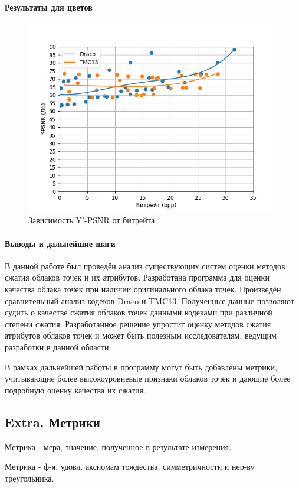 \documentclass[a4paper,12pt]{extreport}
\begin{document}
\paragraph{Результаты для цветов}

\begin{figure}[H]
    \centering
    \includegraphics[width=0.49\linewidth]{assets/approx_y_psnr.png}
    \caption{ Зависимость Y'-PSNR от битрейта. }
    \label{img:pcc_arena_y_psnr}
\end{figure}

\paragraph{Выводы и дальнейшие шаги}

В данной работе был проведён анализ существующих систем оценки методов сжатия
облаков точек и их атрибутов. Разработана программа для оценки качества облака
точек при наличии оригинального облака точек. Произведён сравнительный анализ
кодеков Draco и TMC13. Полученные данные позволяют судить о качестве сжатия
облаков точек данными кодеками при различной степени сжатия. Разработанное
решение упростит оценку методов сжатия атрибутов облаков точек и может быть
полезным исследователям, ведущим разработки в данной области.

В рамках дальнейшей работы в программу могут быть добавлены метрики, учитывающие
более высокоуровневые признаки облаков точек и дающие более подробную оценку
качества их сжатия.

\subsection*{Extra. Метрики}

\noindent Метрика - мера, значение, полученное в результате измерения.

\noindent Метрика - ф-я, удовл. аксиомам тождества, симметричности и нер-ву
треугольника.
\end{document}
